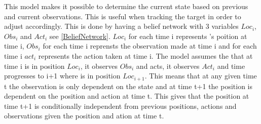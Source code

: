 This model makes it possible to determine the current state based on previous
and current observations. This is useful when tracking the target in order to
adjust \namep accordingly. This is done by having a belief network with 3
variables $Loc_i$, $Obs_i$ and $Act_i$ see \autoref{BeliefNetwork}. $Loc_i$ for
each time i represents \name's poition at time i, $Obs_i$ for each time i reprensts the observation
made at time i and for each time i $act_i$ represents the action taken at time
i. The model assumes the that at time i \namep is in position $Loc_i$, it
observes $Obs_i$ and acts, it observes $Act_i$ and time progresses to i+1 where
\namep is in position $Loc_{i+1}$. This means that at any given time t the
observation is only dependent on the state and at time t+1 the position is
dependent on the position and action at time t. This gives that the position
at time t+1 is conditionally independent from previous positions, actions and
observations given the position and ation at time t. 

